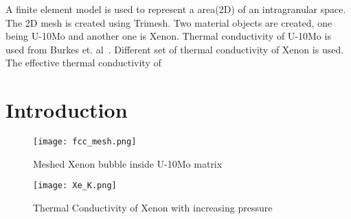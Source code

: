 \begin{doublespacing}

A finite element model is used to represent a area(2D) of an intragranular space. The 2D mesh is created using Trimesh. Two material objects are created, one being U-10Mo and another one is Xenon. Thermal conductivity of U-10Mo is used from Burkes et. al~\cite{burkes2010thermo}. Different set of thermal conductivity of Xenon is used. The effective thermal conductivity of 

\section{Introduction}
\begin{figure}[H]
\centering
\texttt{[image: fcc\_mesh.png]}
\caption{Meshed Xenon bubble inside U-10Mo matrix}
\label{fcc_mesh}
\end{figure}


\begin{figure}[H]
\centering
\texttt{[image: Xe\_K.png]}
\caption{Thermal Conductivity of Xenon with increasing pressure}
\label{fig_Xe_K}
\end{figure}


\end{doublespacing}
